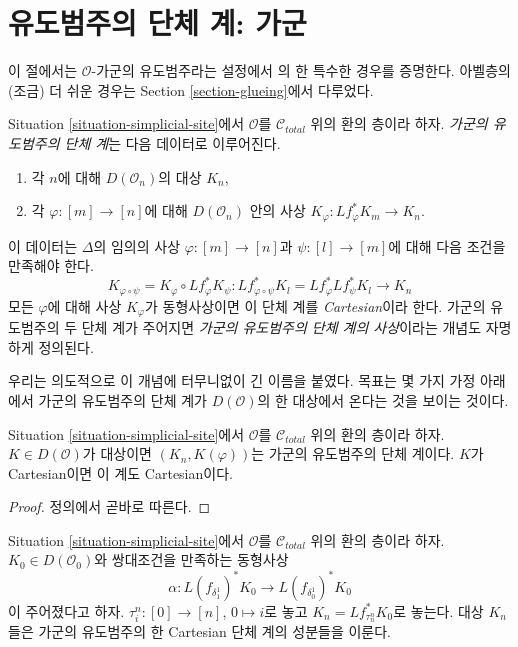 \section{유도범주의 단체 계: 가군}
\label{section-glueing-modules}

\noindent
이 절에서는 $\mathcal{O}$-가군의 유도범주라는 설정에서
\cite[Proposition 3.2.9]{BBD}의 한 특수한 경우를 증명한다.
아벨층의 (조금) 더 쉬운 경우는 Section
\ref{section-glueing}에서 다루었다.

\begin{definition}
\label{definition-cartesian-derived-modules}
Situation \ref{situation-simplicial-site}에서
$\mathcal{O}$를 $\mathcal{C}_{total}$ 위의 환의 층이라 하자.
{\it 가군의 유도범주의 단체 계}는 다음 데이터로 이루어진다.
\begin{enumerate}
\item 각 $n$에 대해 $D(\mathcal{O}_n)$의 대상 $K_n$,
\item 각 $\varphi : [m] \to [n]$에 대해
$D(\mathcal{O}_n)$ 안의 사상
$K_\varphi : Lf_\varphi^*K_m \to K_n$.
\end{enumerate}
이 데이터는 $\Delta$의 임의의 사상
$\varphi : [m] \to [n]$과 $\psi : [l] \to [m]$에 대해
다음 조건을 만족해야 한다.
$$
K_{\varphi \circ \psi} = K_\varphi \circ Lf_\varphi^*K_\psi :
Lf_{\varphi \circ \psi}^*K_l = Lf_\varphi^* Lf_\psi^*K_l
\longrightarrow
K_n
$$
모든 $\varphi$에 대해 사상 $K_\varphi$가 동형사상이면
이 단체 계를 {\it Cartesian}이라 한다.
가군의 유도범주의 두 단체 계가 주어지면
{\it 가군의 유도범주의 단체 계의 사상}이라는 개념도
자명하게 정의된다.
\end{definition}

\noindent
우리는 의도적으로 이 개념에 터무니없이 긴 이름을 붙였다.
목표는 몇 가지 가정 아래에서 가군의 유도범주의 단체 계가
$D(\mathcal{O})$의 한 대상에서 온다는 것을 보이는 것이다.

\begin{lemma}
\label{lemma-cartesian-objects-derived-modules}
Situation \ref{situation-simplicial-site}에서
$\mathcal{O}$를 $\mathcal{C}_{total}$ 위의 환의 층이라 하자.
$K \in D(\mathcal{O})$가 대상이면 $(K_n, K(\varphi))$는
가군의 유도범주의 단체 계이다.
$K$가 Cartesian이면 이 계도 Cartesian이다.
\end{lemma}

\begin{proof}
정의에서 곧바로 따른다.
\end{proof}

\begin{lemma}
\label{lemma-construct-cartesian-objects-derived-modules}
Situation \ref{situation-simplicial-site}에서
$\mathcal{O}$를 $\mathcal{C}_{total}$ 위의 환의 층이라 하자.
$K_0 \in D(\mathcal{O}_0)$와 쌍대조건을 만족하는 동형사상
$$
\alpha :
L(f_{\delta_1^1})^*K_0
\longrightarrow
L(f_{\delta_0^1})^*K_0
$$
이 주어졌다고 하자. $\tau^n_i : [0] \to [n]$, $0 \mapsto i$로 놓고
$K_n = Lf_{\tau^n_n}^*K_0$로 놓는다.
대상 $K_n$들은 가군의 유도범주의 한 Cartesian 단체 계의
성분들을 이룬다.
\end{lemma}

